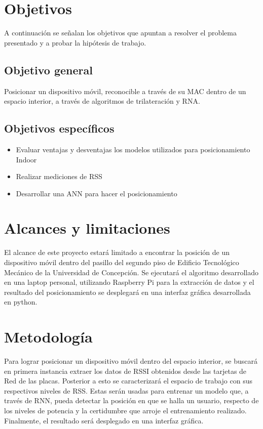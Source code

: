 \section{Objetivos}
A continuación se señalan los objetivos que apuntan a resolver el problema presentado y a probar la hipótesis de trabajo.

\subsection{Objetivo general}
Posicionar un dispositivo móvil, reconocible a través de su \ac{MAC} dentro de un espacio interior, a través de algoritmos de trilateración y \ac{RNA}.

\subsection{Objetivos específicos}
\begin{itemize}
    \item{Evaluar ventajas y desventajas los modelos utilizados para posicionamiento Indoor}
    \item{Realizar mediciones de RSS}
    \item{Desarrollar una ANN para hacer el posicionamiento}
\end{itemize}

\section{Alcances y limitaciones}
El alcance de este proyecto estará limitado a encontrar la posición de un dispositivo móvil dentro del pasillo del segundo piso de Edificio Tecnológico Mecánico de la Universidad de Concepción. Se ejecutará el algoritmo desarrollado en una laptop personal, utilizando Raspberry Pi para la extracción de datos y el resultado del posicionamiento se desplegará en una interfaz gráfica desarrollada en python.

\section{Metodología}

Para lograr posicionar un dispositivo móvil dentro del espacio interior, se buscará en primera instancia extraer los datos de RSSI obtenidos desde las tarjetas de Red de las placas. Posterior a esto se caracterizará el espacio de trabajo con sus respectivos niveles de RSS. Estas serán usadas para entrenar un modelo que, a través de RNN, pueda detectar la posición en que se halla un usuario, respecto de los niveles de potencia y la certidumbre que arroje el entrenamiento realizado. Finalmente, el resultado será desplegado en una interfaz gráfica.